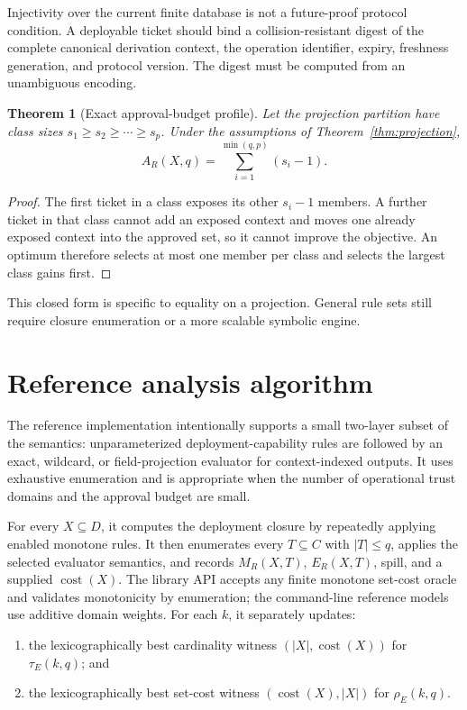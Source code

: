 \documentclass[preprint,12pt]{elsarticle}
\newtheorem{theorem}{Theorem}
\newcommand{\Cost}{\operatorname{cost}}
\begin{document}
Injectivity over the current finite database is not a future-proof protocol
condition.  A deployable ticket should bind a collision-resistant digest of
the complete canonical derivation context, the operation identifier, expiry,
freshness generation, and protocol version.  The digest must be computed from
an unambiguous encoding.

\begin{theorem}[Exact approval-budget profile]
\label{thm:budget-profile}
Let the projection partition have class sizes
$s_1\ge s_2\ge\cdots\ge s_p$.  Under the assumptions of
Theorem~\ref{thm:projection},
\[
A_R(X,q)=\sum_{i=1}^{\min(q,p)}(s_i-1).
\]
\end{theorem}

\begin{proof}
The first ticket in a class exposes its other $s_i-1$ members.  A further
ticket in that class cannot add an exposed context and moves one already
exposed context into the approved set, so it cannot improve the objective.
An optimum therefore selects at most one member per class and selects the
largest class gains first.
\end{proof}

This closed form is specific to equality on a projection.  General rule sets
still require closure enumeration or a more scalable symbolic engine.

\section{Reference analysis algorithm}

The reference implementation intentionally supports a small two-layer subset
of the semantics: unparameterized deployment-capability rules are followed by
an exact, wildcard, or field-projection evaluator for context-indexed outputs.
It uses exhaustive enumeration and is appropriate when the number of
operational trust domains and the approval budget are small.

For every $X\subseteq D$, it computes the deployment closure by repeatedly
applying enabled monotone rules. It then enumerates every $T\subseteq C$ with
$|T|\le q$, applies the selected evaluator semantics, and records
$M_R(X,T)$, $E_R(X,T)$, spill, and a supplied $\Cost(X)$.  The library API
accepts any finite monotone set-cost oracle and validates monotonicity by
enumeration; the command-line reference models use additive domain weights.
For each $k$, it separately updates:

\begin{enumerate}[leftmargin=*]
\item the lexicographically best cardinality witness
  $(|X|,\Cost(X))$ for $\tau_E(k,q)$; and
\item the lexicographically best set-cost witness
  $(\Cost(X),|X|)$ for $\rho_E(k,q)$.
\end{enumerate}
\end{document}
